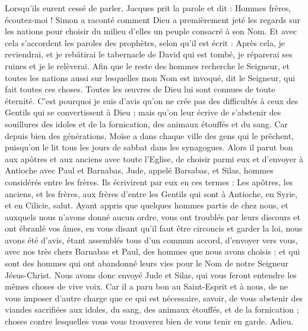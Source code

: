 \begin{multicols}{2}
{{ 
Lorsqu'ils eurent cessé de parler, Jacques prit la parole et dit : Hommes frères, écoutez-moi !
Simon a raconté comment Dieu a premièrement jeté les regards sur les nations pour choisir du milieu d'elles un peuple consacré à son Nom. 
Et avec cela s'accordent les paroles des prophètes, selon qu'il est écrit :
Après cela, je reviendrai, et je rebâtirai le tabernacle de David qui est tombé, je réparerai ses ruines et je le relèverai.
Afin que le reste des hommes recherche le Seigneur, et toutes les nations aussi sur lesquelles mon Nom est invoqué, dit le Seigneur, qui fait toutes ces choses.
Toutes les œuvres de Dieu lui sont connues de toute éternité.
C'est pourquoi je suis d'avis qu'on ne crée pas des difficultés à ceux des Gentils qui se convertissent à Dieu ;
mais qu'on leur écrive de s'abstenir des souillures des idoles et de la fornication, des animaux étouffés et du sang.
Car depuis bien des générations, Moïse a dans chaque ville des gens qui le prêchent, puisqu'on le lit tous les jours de sabbat dans les synagogues.
Alors il parut bon aux apôtres et aux anciens avec toute l'Eglise, de choisir parmi eux et d'envoyer à Antioche avec Paul et Barnabas, Jude, appelé Barsabas, et Silas, hommes considérés entre les frères.
Ils écrivirent par eux en ces termes : Les apôtres, les anciens, et les frères, aux frères d'entre les Gentils qui sont à Antioche, en Syrie, et en Cilicie, salut.
Ayant appris que quelques hommes partis de chez nous, et auxquels nous n'avons donné aucun ordre, vous ont troublés par leurs discours et ont ébranlé vos âmes, en vous disant qu'il faut être circoncis et garder la loi,
nous avons été d'avis, étant assemblés tous d'un commun accord, d'envoyer vers vous, avec nos très chers Barnabas et Paul, des hommes que nous avons choisis ;
et qui sont des hommes qui ont abandonné leurs vies pour le Nom de notre Seigneur Jésus-Christ.
Nous avons donc envoyé Jude et Silas, qui vous feront entendre les mêmes choses de vive voix.
Car il a paru bon au Saint-Esprit et à nous, de ne vous imposer d'autre charge que ce qui est nécessaire,
savoir, de vous abstenir des viandes sacrifiées aux idoles, du sang, des animaux étouffés, et de la fornication ; choses contre lesquelles vous vous trouverez bien de vous tenir en garde. Adieu.
}}
\end{multicols}
